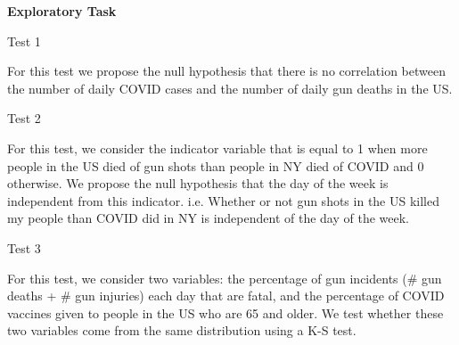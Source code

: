\documentclass[12pt]{article}
\def\pp{\par\noindent}
\newcommand{\problem}[1]{\bigskip\pp\textbf{Part #1}\smallskip}
\renewcommand{\part}[1]{\smallskip\pp\textbf{#1)}\indent}
\begin{document}
\bigskip\pp\textbf{Exploratory Task}\smallskip
\pp Test 1
\par For this test we propose the null hypothesis that there is no
correlation between the number of daily COVID cases and the number of
daily gun deaths in the US.

\pp Test 2
\par For this test, we consider the indicator variable that is equal
to 1 when more people in the US died of gun shots than people in NY
died of COVID and 0 otherwise. We propose the null hypothesis that the day of the
week is independent from this indicator. i.e. Whether or not gun shots in
the US killed my people than COVID did in NY is independent of the day
of the week.

\pp Test 3
\par For this test, we consider two variables: the percentage of gun
incidents (\# gun deaths + \# gun injuries) each day that are fatal, and
the percentage of COVID vaccines given to people in the US who are 65
and older. We test whether these two variables come from the same
distribution using a K-S test.

\end{document}
